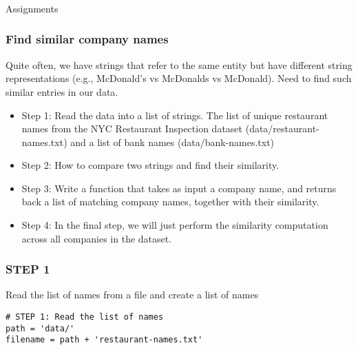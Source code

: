 \begin{frame}[fragile]\frametitle{}
\begin{center}
{\Large Assignments}
\end{center}
\end{frame}


\begin{frame}[fragile]\frametitle{Find similar company names}
Quite often, we have strings that refer to the same entity but have different string representations (e.g., McDonald's vs McDonalds vs McDonald). Need to find such similar entries in our data.
  \begin{itemize}
  \item Step 1: Read the data into a list of strings. The list of unique restaurant names from the NYC Restaurant Inspection dataset (data/restaurant-names.txt) and a list of bank names (data/bank-names.txt)
  \item Step 2: How to compare two strings and find their similarity.
  \item Step 3: Write a function that takes as input a company name, and returns back a list of matching company names, together with their similarity.
  \item Step 4: In the final step, we will just perform the similarity computation across all companies in the dataset.
  \end{itemize}
\end{frame}

\begin{frame}[fragile]\frametitle{STEP 1}
Read the list of names from a file and create a list of names
  \begin{lstlisting}
# STEP 1: Read the list of names 
path = 'data/'
filename = path + 'restaurant-names.txt'
  \end{lstlisting}
\end{frame}

